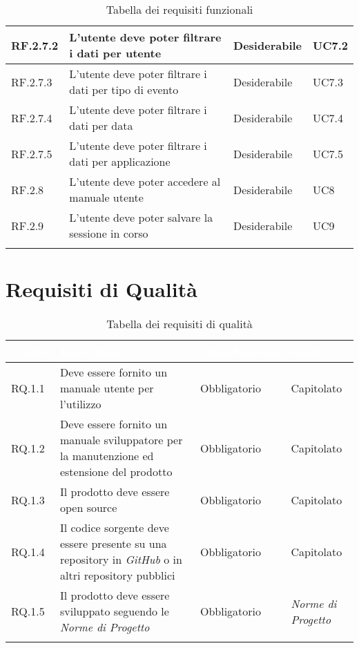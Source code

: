 \begin{center}
\begin{longtable}{|L{1,5cm}|C{5,5cm}|C{3cm}|C{2cm}|}
    RF.2.7.2 & L'utente deve poter filtrare i dati per utente & Desiderabile & UC7.2 \\ \hline
    RF.2.7.3 & L'utente deve poter filtrare i dati per tipo di evento & Desiderabile & UC7.3 \\ \hline
    RF.2.7.4 & L'utente deve poter filtrare i dati per data & Desiderabile & UC7.4 \\ \hline
    RF.2.7.5 & L'utente deve poter filtrare i dati per applicazione & Desiderabile & UC7.5 \\ \hline
    RF.2.8 & L'utente deve poter accedere al manuale utente & Desiderabile & UC8 \\ \hline
    RF.2.9 & L'utente deve poter salvare la sessione in corso & Desiderabile & UC9 \\ \hline

    \caption{Tabella dei requisiti funzionali}
  \end{longtable}
\end{center}

\section{Requisiti di Qualità}
\begin{center}
  \centering
  \begin{longtable}{|L{1,5cm}|C{5,5cm}|C{3cm}|C{2cm}|}
    \hline
    \textcolor[HTML]{FFFFFF}{\textbf{Codice}} & \textcolor[HTML]{FFFFFF}{\textbf{Descrizione}} & \textcolor[HTML]{FFFFFF}{\textbf{Classificazione}} & \textcolor[HTML]{FFFFFF}{\textbf{Fonti}}
    \\ \hline
    RQ.1.1 & Deve essere fornito un manuale utente per l'utilizzo & Obbligatorio & Capitolato \\ \hline
    RQ.1.2 & Deve essere fornito un manuale sviluppatore per la manutenzione ed estensione del prodotto & Obbligatorio & Capitolato \\ \hline
    RQ.1.3 & Il prodotto deve essere open source & Obbligatorio & Capitolato \\ \hline
    RQ.1.4 & Il codice sorgente deve essere presente su una repository in \textit{GitHub} o in altri repository pubblici & Obbligatorio & Capitolato \\ \hline
    RQ.1.5 & Il prodotto deve essere sviluppato seguendo le \textit{Norme di Progetto} & Obbligatorio & \textit{Norme di Progetto} \\ \hline

    \caption{Tabella dei requisiti di qualità}
  \end{longtable}
\end{center}

